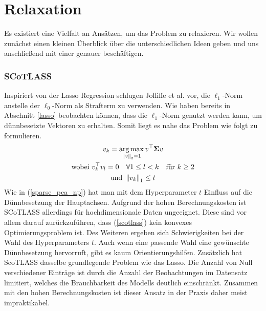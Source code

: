 

\section{Relaxation}
\label{relaxation}

Es existiert eine Vielfalt an Ansätzen, um das Problem zu relaxieren. Wir wollen zunächst einen kleinen Überblick über die unterschiedlichen Ideen geben und uns anschließend mit einer genauer beschäftigen. 

\subsubsection{SCoTLASS}

Inspiriert von der Lasso Regression \cite{tibshirani_lasso} schlugen Jolliffe et al. \cite{scotlass} vor, die $\ell_1$-Norm anstelle der $\ell_0$-Norm als Strafterm zu verwenden. Wie haben bereits in Abschnitt \ref{lasso} beobachten können, dass die $\ell_1$-Norm genutzt werden kann, um dünnbesetzte Vektoren zu erhalten. Somit liegt es nahe das Problem wie folgt zu formulieren.
\begin{gather}
\label{scotlass}
\begin{gathered}
v_{k} = \operatorname*{arg\,max}_{\left\lVert v \right\rVert_2 = 1} v^{\top}\mathbf{\Sigma} v\\
\text{wobei } v_{k}^{\top}v_{l} = 0 \quad \forall 1 \leq l < k \quad \text{für } k\geq 2\\
\text{und } \left\lVert v_{k} \right\rVert_1 \leq t 
\end{gathered}
\end{gather}
Wie in (\ref{sparse_pca_np}) hat man mit dem Hyperparameter $t$ Einfluss auf die Dünnbesetzung der Hauptachsen. Aufgrund der hohen Berechnungskosten ist SCoTLASS allerdings für hochdimensionale Daten ungeeignet. Diese sind vor allem darauf zurückzuführen, dass (\ref{scotlass}) kein konvexes Optimierungsproblem ist. Des Weiteren ergeben sich Schwierigkeiten bei der Wahl des Hyperparameters $t$. Auch wenn eine passende Wahl eine gewünschte Dünnbesetzung hervorruft, gibt es kaum Orientierungshilfen. Zusätzlich hat ScoTLASS dasselbe grundlegende Problem wie das Lasso. Die Anzahl von Null verschiedener Einträge ist durch die Anzahl der Beobachtungen im Datensatz limitiert, welches die Brauchbarkeit des Modells deutlich einschränkt. Zusammen mit den hohen Berechnungskosten ist dieser Ansatz in der Praxis daher meist impraktikabel.

